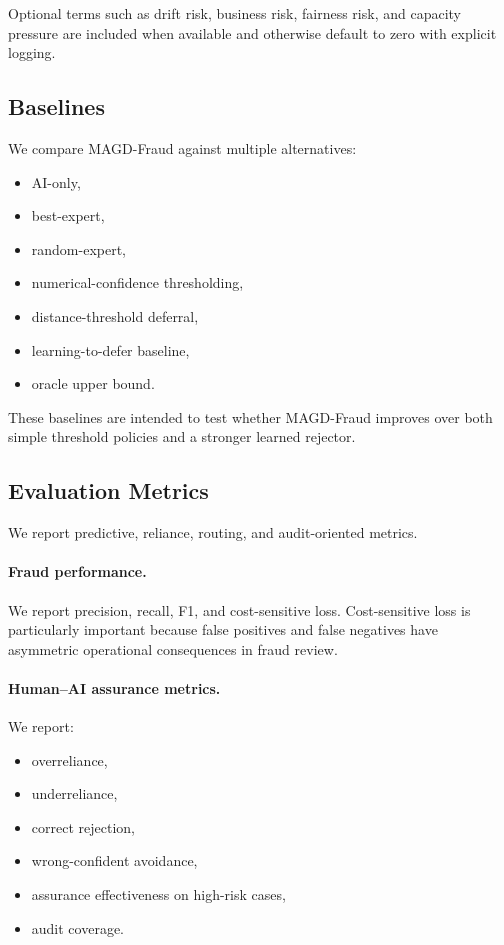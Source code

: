 Optional terms such as drift risk, business risk, fairness risk, and capacity pressure are included when available and otherwise default to zero with explicit logging.

\subsection{Baselines}
\label{subsec:baselines}

We compare MAGD-Fraud against multiple alternatives:
\begin{itemize}
\item AI-only,
\item best-expert,
\item random-expert,
\item numerical-confidence thresholding,
\item distance-threshold deferral,
\item learning-to-defer baseline,
\item oracle upper bound.
\end{itemize}

These baselines are intended to test whether MAGD-Fraud improves over both simple threshold policies and a stronger learned rejector.

\subsection{Evaluation Metrics}
\label{subsec:metrics}

We report predictive, reliance, routing, and audit-oriented metrics.

\paragraph{Fraud performance.}
We report precision, recall, F1, and cost-sensitive loss. Cost-sensitive loss is particularly important because false positives and false negatives have asymmetric operational consequences in fraud review.

\paragraph{Human--AI assurance metrics.}
We report:
\begin{itemize}
\item overreliance,
\item underreliance,
\item correct rejection,
\item wrong-confident avoidance,
\item assurance effectiveness on high-risk cases,
\item audit coverage.
\end{itemize}

